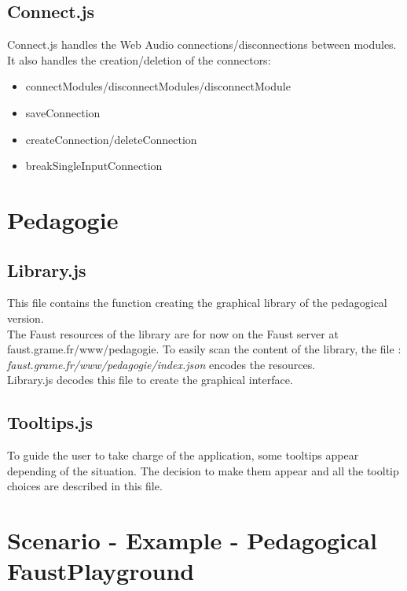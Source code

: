 \documentclass[a4paper]{article}
\begin{document}
\subsection{Connect.js}

Connect.js handles the Web Audio connections/disconnections between modules. It also handles the creation/deletion of the connectors:
\begin{itemize}
\item connectModules/disconnectModules/disconnectModule
\item saveConnection
\item createConnection/deleteConnection
\item breakSingleInputConnection
\end{itemize}

\section{Pedagogie}
\subsection{Library.js}

This file contains the function creating the graphical library of the pedagogical version. \\

The Faust resources of the library are for now on the Faust server at faust.grame.fr/www/pedagogie.
To easily scan the content of the library, the file : {\it faust.grame.fr/www/pedagogie/index.json} encodes the resources. \\
Library.js decodes this file to create the graphical interface.

\subsection{Tooltips.js}

To guide the user to take charge of the application, some tooltips appear depending of the situation.
The decision to make them appear and all the tooltip choices are described in this file.

\newpage
\section{Scenario - Example - Pedagogical FaustPlayground}
\end{document}
